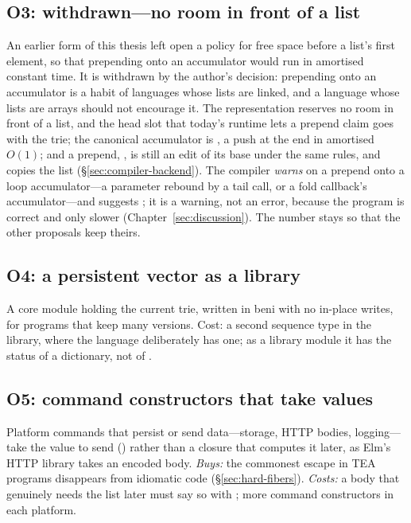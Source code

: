 \subsection*{O3: withdrawn---no room in front of a list}

An earlier form of this thesis left open a policy for free space before a list's first element, so that
prepending onto an accumulator would run in amortised constant time. It is withdrawn by the author's
decision: prepending onto an accumulator is a habit of languages whose lists are linked, and a language
whose lists are arrays should not encourage it. The representation reserves no room in front of a list,
and the head slot that today's runtime lets a prepend claim goes with the trie; the canonical accumulator is
\code{[ …acc, x ]}, a push at the end in amortised $O(1)$; and a prepend, \code{[ x, …acc ]}, is still an
edit of its base under the same rules, and copies the list (\S\ref{sec:compiler-backend}). The compiler
\emph{warns} on a prepend onto a loop accumulator---a parameter rebound by a tail call, or a fold
callback's accumulator---and suggests \code{[ …acc, x ]}; it is a warning, not an error, because the
program is correct and only slower (Chapter~\ref{sec:discussion}). The number stays so that the other
proposals keep theirs.

\subsection*{O4: a persistent vector as a library}

A core module holding the current trie, written in beni with no in-place writes, for programs that keep
many versions. Cost: a second sequence type in the library, where the language deliberately has one; as a
library module it has the status of a dictionary, not of .

\subsection*{O5: command constructors that take values}

Platform commands that persist or send data---storage, HTTP bodies, logging---take the value to send
() rather than a closure that computes it later, as Elm's HTTP library takes an
encoded body. \emph{Buys:} the commonest escape in TEA programs disappears from idiomatic code
(\S\ref{sec:hard-fibers}). \emph{Costs:} a body that genuinely needs the list later must say so with
; more command constructors in each platform.

